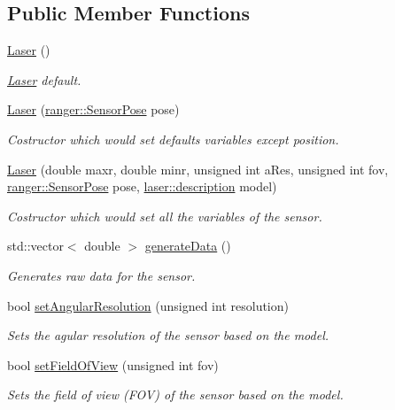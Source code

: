 \subsection*{Public Member Functions}
\begin{DoxyCompactItemize}
\item 
\hyperlink{classLaser_a68465e89283dffcc29a37e94693c6f87}{Laser} ()
\begin{DoxyCompactList}\small\item\em \hyperlink{classLaser}{Laser} default. \end{DoxyCompactList}\item 
\hyperlink{classLaser_abb99761eebf2ed73ab2fe3333c69dcdf}{Laser} (\hyperlink{structranger_1_1SensorPose}{ranger\+::\+Sensor\+Pose} pose)
\begin{DoxyCompactList}\small\item\em Costructor which would set defaults variables except position. \end{DoxyCompactList}\item 
\hyperlink{classLaser_a59ac47c673627b4af3fe3cc482545e1e}{Laser} (double maxr, double minr, unsigned int a\+Res, unsigned int fov, \hyperlink{structranger_1_1SensorPose}{ranger\+::\+Sensor\+Pose} pose, \hyperlink{namespacelaser_a986280215cdbdd42579d301afef1d22a}{laser\+::description} model)
\begin{DoxyCompactList}\small\item\em Costructor which would set all the variables of the sensor. \end{DoxyCompactList}\item 
std\+::vector$<$ double $>$ \hyperlink{classLaser_af2d93a5e123f3b637be6d3383019562b}{generate\+Data} ()
\begin{DoxyCompactList}\small\item\em Generates raw data for the sensor. \end{DoxyCompactList}\item 
bool \hyperlink{classLaser_a518ac84d4631b1550330d664e161ca0a}{set\+Angular\+Resolution} (unsigned int resolution)
\begin{DoxyCompactList}\small\item\em Sets the agular resolution of the sensor based on the model. \end{DoxyCompactList}\item 
bool \hyperlink{classLaser_a5f140784aae7e82c2aa0f690548d6ebb}{set\+Field\+Of\+View} (unsigned int fov)
\begin{DoxyCompactList}\small\item\em Sets the field of view (F\+OV) of the sensor based on the model. \end{DoxyCompactList}\end{DoxyCompactItemize}

